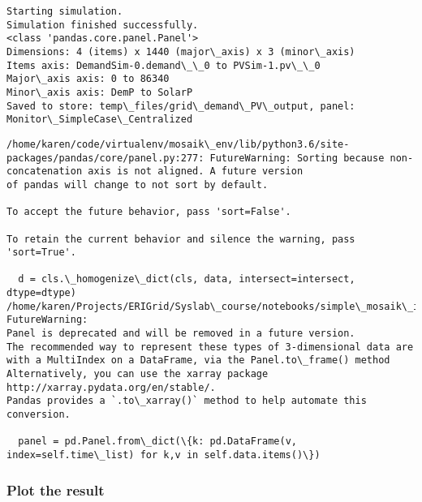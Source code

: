 \documentclass[11pt]{article}
\begin{document}
    \begin{Verbatim}[commandchars=\\\{\}]
Starting simulation.
Simulation finished successfully.
<class 'pandas.core.panel.Panel'>
Dimensions: 4 (items) x 1440 (major\_axis) x 3 (minor\_axis)
Items axis: DemandSim-0.demand\_\_0 to PVSim-1.pv\_\_0
Major\_axis axis: 0 to 86340
Minor\_axis axis: DemP to SolarP
Saved to store: temp\_files/grid\_demand\_PV\_output, panel: Monitor\_SimpleCase\_Centralized

    \end{Verbatim}

    \begin{Verbatim}[commandchars=\\\{\}]
/home/karen/code/virtualenv/mosaik\_env/lib/python3.6/site-packages/pandas/core/panel.py:277: FutureWarning: Sorting because non-concatenation axis is not aligned. A future version
of pandas will change to not sort by default.

To accept the future behavior, pass 'sort=False'.

To retain the current behavior and silence the warning, pass 'sort=True'.

  d = cls.\_homogenize\_dict(cls, data, intersect=intersect, dtype=dtype)
/home/karen/Projects/ERIGrid/Syslab\_course/notebooks/simple\_mosaik\_intro/scenario\_build\_up/collector.py:70: FutureWarning: 
Panel is deprecated and will be removed in a future version.
The recommended way to represent these types of 3-dimensional data are with a MultiIndex on a DataFrame, via the Panel.to\_frame() method
Alternatively, you can use the xarray package http://xarray.pydata.org/en/stable/.
Pandas provides a `.to\_xarray()` method to help automate this conversion.

  panel = pd.Panel.from\_dict(\{k: pd.DataFrame(v, index=self.time\_list) for k,v in self.data.items()\})

    \end{Verbatim}

    \subsubsection{Plot the result}\label{plot-the-result}
\end{document}
